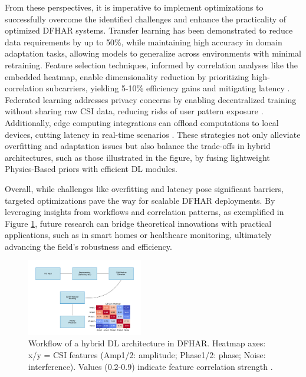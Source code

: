 \documentclass[Afour,sageh,times]{sagej}
\begin{document}
From these perspectives, it is imperative to implement optimizations to successfully overcome the identified challenges and enhance the practicality of optimized DFHAR systems. Transfer learning has been demonstrated to reduce data requirements by up to 50\%, while maintaining high accuracy in domain adaptation tasks\citep{zhou2022target}, allowing models to generalize across environments with minimal retraining. Feature selection techniques, informed by correlation analyses like the embedded heatmap, enable dimensionality reduction by prioritizing high-correlation subcarriers, yielding 5-10\% efficiency gains and mitigating latency \citep{zhou2022target}. Federated learning addresses privacy concerns by enabling decentralized training without sharing raw CSI data, reducing risks of user pattern exposure \citep{ma2019wifi}. Additionally, edge computing integrations can offload computations to local devices, cutting latency in real-time scenarios \citep{shen2022graph}. These strategies not only alleviate overfitting and adaptation issues but also balance the trade-offs in hybrid architectures, such as those illustrated in the figure, by fusing lightweight Physics-Based priors with efficient DL modules.

Overall, while challenges like overfitting and latency pose significant barriers, targeted optimizations pave the way for scalable DFHAR deployments. By leveraging insights from workflows and correlation patterns, as exemplified in Figure \ref{fig:dl_architecture_heatmap_embedded}, future research can bridge theoretical innovations with practical applications, such as in smart homes or healthcare monitoring, ultimately advancing the field's robustness and efficiency.

\begin{figure}[htbp]
\centering
\includegraphics[width=0.45\textwidth]{7.dl_architecture_heatmap_embedded.pdf}
\caption{Workflow of a hybrid DL architecture in DFHAR. Heatmap axes: x/y = CSI features (Amp1/2: amplitude; Phase1/2: phase; Noise: interference). Values (0.2-0.9) indicate feature correlation strength \citep{chen2018wifi, guo2019robust}.}
\label{fig:dl_architecture_heatmap_embedded}
\end{figure}
\end{document}

